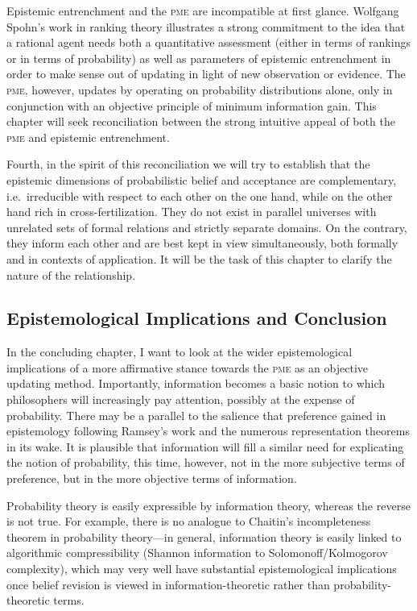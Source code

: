 \documentclass[11pt]{article}
\begin{document}
Epistemic entrenchment and the \textsc{pme} are incompatible at first glance.
Wolfgang Spohn's work in ranking theory illustrates a strong
commitment to the idea that a rational agent needs both a quantitative
assessment (either in terms of rankings or in terms of probability) as
well as parameters of epistemic entrenchment in order to make sense
out of updating in light of new observation or evidence. The \textsc{pme},
however, updates by operating on probability distributions alone, only
in conjunction with an objective principle of minimum information
gain. This chapter will seek reconciliation between the strong
intuitive appeal of both the \textsc{pme} and epistemic entrenchment.

Fourth, in the spirit of this reconciliation we will try to establish
that the epistemic dimensions of probabilistic belief and acceptance
are complementary, i.e.\ irreducible with respect to each other on the
one hand, while on the other hand rich in cross-fertilization. They do
not exist in parallel universes with unrelated sets of formal
relations and strictly separate domains. On the contrary, they inform
each other and are best kept in view simultaneously, both formally and
in contexts of application. It will be the task of this chapter to
clarify the nature of the relationship.

\subsection{Epistemological Implications and Conclusion}
\label{EpistemologicalImplications}

In the concluding chapter, I want to look at the wider epistemological
implications of a more affirmative stance towards the \textsc{pme} as
an objective updating method. Importantly, information becomes a
basic notion to which philosophers will increasingly pay attention,
possibly at the expense of probability. There may be a parallel to the
salience that preference gained in epistemology following Ramsey's
work and the numerous representation theorems in its wake. It is
plausible that information will fill a similar need for explicating
the notion of probability, this time, however, not in the more
subjective terms of preference, but in the more objective terms of
information.

Probability theory is easily expressible by information theory,
whereas the reverse is not true. For example, there is no analogue to
Chaitin's incompleteness theorem in probability theory---in general,
information theory is easily linked to algorithmic compressibility
(Shannon information to Solomonoff/\-Kolmogorov complexity), which may
very well have substantial epistemological implications once belief
revision is viewed in information-theoretic rather than
probability-theoretic terms. 
\end{document}
